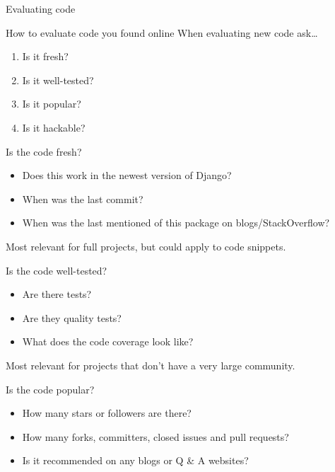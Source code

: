 \documentclass[xcolor=dvipsnames]{beamer}
\begin{document}
\begin{section}{Evaluating code}

  \begin{frame}{How to evaluate code you found online}
    When evaluating new code ask\ldots

    \begin{enumerate}
      \item Is it fresh?
      \item Is it well-tested?
      \item Is it popular?
      \item Is it hackable?
    \end{enumerate}
  \end{frame}

  \begin{frame}{Is the code fresh?}
    \begin{itemize}
      \item Does this work in the newest version of Django?
      \item When was the last commit?
      \item When was the last mentioned of this package on blogs/StackOverflow?
    \end{itemize}

    \bigskip
    Most relevant for full projects, but could apply to code snippets.
  \end{frame}

  \begin{frame}{Is the code well-tested?}
    \begin{itemize}
      \item Are there tests?
      \item Are they quality tests?
      \item What does the code coverage look like?
    \end{itemize}

    \bigskip
    Most relevant for projects that don't have a very large community.
  \end{frame}

  \begin{frame}{Is the code popular?}
    \begin{itemize}
      \item How many stars or followers are there?
      \item How many forks, committers, closed issues and pull requests?
      \item Is it recommended on any blogs or Q \& A websites?
    \end{itemize}


\end{frame}
\end{section}
\end{document}
